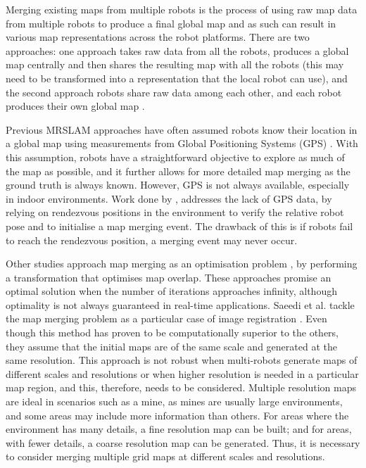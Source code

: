 Merging existing maps from multiple robots is the process of using raw map data from multiple robots to produce a final global map and as such can result in various map representations across the robot platforms. There are two approaches: one approach takes raw data from all the robots, produces a global map centrally and then shares the resulting map with all the robots (this may need to be transformed into a representation that the local robot can use), and the second approach robots share raw data among each other, and each robot produces their own global map \cite{Saeedi}. 

Previous MRSLAM approaches have often assumed robots know their location in a global map using measurements from Global Positioning Systems (GPS) \cite{Sukkarieh2006,Kim2007a}. With this assumption, robots have a straightforward objective to explore as much of the map as possible, and it further allows for more detailed map merging as the ground truth is always known. However, GPS is not always available, especially in indoor environments. Work done by \cite{Sheng2006}, \cite{Matari2004} addresses the lack of GPS data, by relying on rendezvous positions in the environment to verify the relative robot pose and to initialise a map merging event. The drawback of this is if robots fail to reach the rendezvous position, a merging event may never occur. 

Other studies approach map merging as an optimisation problem \cite{Carpin2005a,XinMa2008,Carpin2008}, by performing a transformation that optimises map overlap. These approaches promise an optimal solution when the number of iterations approaches infinity, although optimality is not always guaranteed in real-time applications. Saeedi et al. tackle the map merging problem as a particular case of image registration \cite{Saeedi2014c, Saeedi2012a}. Even though this method has proven to be computationally superior to the others, they assume that the initial maps are of the same scale and generated at the same resolution. This approach is not robust when multi-robots generate maps of different scales and resolutions or when higher resolution is needed in a particular map region, and this, therefore,  needs to be considered. Multiple resolution maps are ideal in scenarios such as a mine, as mines are usually large environments, and some areas may include more information than others.  For areas where the environment has many details, a fine resolution map can be built; and for areas, with fewer details, a coarse resolution map can be generated. Thus, it is necessary to consider merging multiple grid maps at different scales and resolutions.

